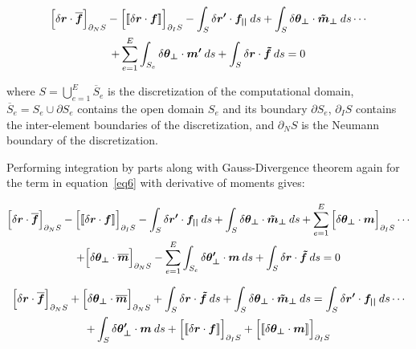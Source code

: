 \documentclass[12pt,twoside]{article}
\newcommand{\jump}[1]{\ensuremath{[\![#1]\!]} }
\begin{document}
\begin{gather}
  \Big[\delta\boldsymbol{r} \cdot \boldsymbol{\overline{f}}\Big]_{\partial_{N} S} - \Big[\jump{\delta\boldsymbol{r} \cdot \boldsymbol{f}}\Big]_{\partial_{I} S} - \int_{S} \delta\boldsymbol{r^{\prime}}\cdot\boldsymbol{f_{||}}\:ds + \int_{S} \delta \boldsymbol{\theta_{\perp}}\cdot\boldsymbol{\tilde{m}_{\perp}}\:ds \cdots \notag \\
  + \sum_{e=1}^{E} \int_{S_{e}} \delta \boldsymbol{\theta_{\perp}}\cdot\boldsymbol{m^{\prime}}\:ds + \int_{S} \delta\boldsymbol{r} \cdot \boldsymbol{\tilde{f}}\:ds = 0 \label{eq6}
\end{gather}

\noindent
where $S = \bigcup\limits_{e=1}^{E}\overline{S}_{e}$ is the discretization of the computational domain, $\overline{S}_{e} = S_{e}\cup\partial S_{e}$ contains the open domain $S_{e}$ and its boundary $\partial S_{e}$, $\partial_{I} S$ contains the inter-element boundaries of the discretization, and $\partial_{N} S$ is the Neumann boundary of the discretization.

\noindent
Performing integration by parts along with Gauss-Divergence theorem again for the term in equation~\ref{eq6} with derivative of moments gives:

\begin{gather}
  \Big[\delta\boldsymbol{r} \cdot \boldsymbol{\overline{f}}\Big]_{\partial_{N} S} - \Big[\jump{\delta\boldsymbol{r} \cdot \boldsymbol{f}}\Big]_{\partial_{I} S} - \int_{S} \delta\boldsymbol{r^{\prime}}\cdot\boldsymbol{f_{||}}\:ds + \int_{S} \delta \boldsymbol{\theta_{\perp}}\cdot\boldsymbol{\tilde{m}_{\perp}}\:ds + \sum_{e=1}^{E} \Big[\delta \boldsymbol{\theta_{\perp}}\cdot\boldsymbol{m}\Big]_{\partial_{I} S} \cdots \notag \\
  + \Big[\delta \boldsymbol{\theta_{\perp}}\cdot\boldsymbol{\overline{m}}\Big]_{\partial_{N} S} - \sum_{e=1}^{E} \int_{S_{e}} \delta \boldsymbol{\theta_{\perp}^{\prime}}\cdot\boldsymbol{m}\:ds + \int_{S} \delta\boldsymbol{r} \cdot \boldsymbol{\tilde{f}}\:ds = 0
\end{gather}

\begin{gather}
  \Big[\delta\boldsymbol{r} \cdot \boldsymbol{\overline{f}}\Big]_{\partial_{N} S} + \Big[\delta \boldsymbol{\theta_{\perp}}\cdot\boldsymbol{\overline{m}}\Big]_{\partial_{N} S}  + \int_{S} \delta\boldsymbol{r} \cdot \boldsymbol{\tilde{f}}\:ds + \int_{S} \delta \boldsymbol{\theta_{\perp}}\cdot\boldsymbol{\tilde{m}_{\perp}}\:ds = \int_{S} \delta\boldsymbol{r^{\prime}}\cdot\boldsymbol{f_{||}}\:ds \cdots \notag \\
  + \int_{S} \delta \boldsymbol{\theta_{\perp}^{\prime}}\cdot\boldsymbol{m}\:ds + \Big[\jump{\delta\boldsymbol{r} \cdot \boldsymbol{f}}\Big]_{\partial_{I} S} + \Big[\jump{\delta \boldsymbol{\theta_{\perp}}\cdot\boldsymbol{m}}\Big]_{\partial_{I} S}
\end{gather}
\end{document}
